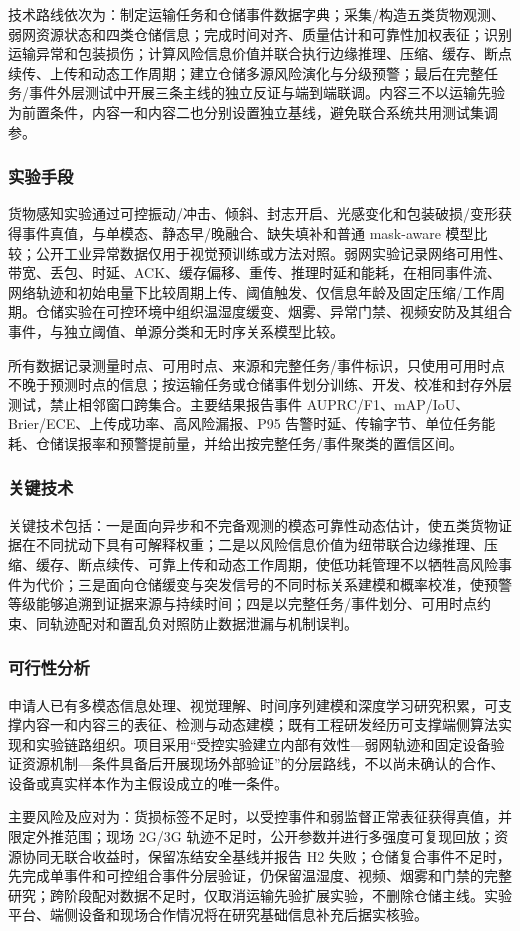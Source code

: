 技术路线依次为：制定运输任务和仓储事件数据字典；采集/构造五类货物观测、弱网资源状态和四类仓储信息；完成时间对齐、质量估计和可靠性加权表征；识别运输异常和包装损伤；计算风险信息价值并联合执行边缘推理、压缩、缓存、断点续传、上传和动态工作周期；建立仓储多源风险演化与分级预警；最后在完整任务/事件外层测试中开展三条主线的独立反证与端到端联调。内容三不以运输先验为前置条件，内容一和内容二也分别设置独立基线，避免联合系统共用测试集调参。

\subsubsection{实验手段}

货物感知实验通过可控振动/冲击、倾斜、封志开启、光感变化和包装破损/变形获得事件真值，与单模态、静态早/晚融合、缺失填补和普通 mask-aware 模型比较；公开工业异常数据仅用于视觉预训练或方法对照。弱网实验记录网络可用性、带宽、丢包、时延、ACK、缓存偏移、重传、推理时延和能耗，在相同事件流、网络轨迹和初始电量下比较周期上传、阈值触发、仅信息年龄及固定压缩/工作周期。仓储实验在可控环境中组织温湿度缓变、烟雾、异常门禁、视频安防及其组合事件，与独立阈值、单源分类和无时序关系模型比较。

所有数据记录测量时点、可用时点、来源和完整任务/事件标识，只使用可用时点不晚于预测时点的信息；按运输任务或仓储事件划分训练、开发、校准和封存外层测试，禁止相邻窗口跨集合。主要结果报告事件 AUPRC/F1、mAP/IoU、Brier/ECE、上传成功率、高风险漏报、P95 告警时延、传输字节、单位任务能耗、仓储误报率和预警提前量，并给出按完整任务/事件聚类的置信区间。

\subsubsection{关键技术}

关键技术包括：一是面向异步和不完备观测的模态可靠性动态估计，使五类货物证据在不同扰动下具有可解释权重；二是以风险信息价值为纽带联合边缘推理、压缩、缓存、断点续传、可靠上传和动态工作周期，使低功耗管理不以牺牲高风险事件为代价；三是面向仓储缓变与突发信号的不同时标关系建模和概率校准，使预警等级能够追溯到证据来源与持续时间；四是以完整任务/事件划分、可用时点约束、同轨迹配对和置乱负对照防止数据泄漏与机制误判。

\subsubsection{可行性分析}

申请人已有多模态信息处理、视觉理解、时间序列建模和深度学习研究积累，可支撑内容一和内容三的表征、检测与动态建模；既有工程研发经历可支撑端侧算法实现和实验链路组织。项目采用“受控实验建立内部有效性—弱网轨迹和固定设备验证资源机制—条件具备后开展现场外部验证”的分层路线，不以尚未确认的合作、设备或真实样本作为主假设成立的唯一条件。

主要风险及应对为：货损标签不足时，以受控事件和弱监督正常表征获得真值，并限定外推范围；现场 2G/3G 轨迹不足时，公开参数并进行多强度可复现回放；资源协同无联合收益时，保留冻结安全基线并报告 H2 失败；仓储复合事件不足时，先完成单事件和可控组合事件分层验证，仍保留温湿度、视频、烟雾和门禁的完整研究；跨阶段配对数据不足时，仅取消运输先验扩展实验，不删除仓储主线。实验平台、端侧设备和现场合作情况将在研究基础信息补充后据实核验。
